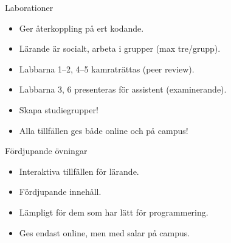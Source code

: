 \begin{frame}
  \begin{block}{Laborationer}
    \begin{itemize}
      \item Ger återkoppling på ert kodande.
      \item Lärande är socialt, arbeta i grupper (max tre/grupp).
      \item Labbarna 1--2, 4--5 kamraträttas (peer review).
      \item Labbarna 3, 6 presenteras för assistent (examinerande).
    \end{itemize}
  \end{block}

  \pause

  \begin{remark}
    \begin{itemize}
      \item Skapa studiegrupper!
    \end{itemize}
  \end{remark}
\end{frame}

\begin{frame}
  \begin{remark}
    \begin{itemize}
      \item Alla tillfällen ges både online och på campus!
    \end{itemize}
  \end{remark}
\end{frame}

\begin{frame}
  \begin{block}{Fördjupande övningar}
    \begin{itemize}
      \item Interaktiva tillfällen för lärande.
      \item Fördjupande innehåll.
      \item Lämpligt för dem som har lätt för programmering.
      \item Ges endast online, men med salar på campus.
    \end{itemize}
  \end{block}
\end{frame}


